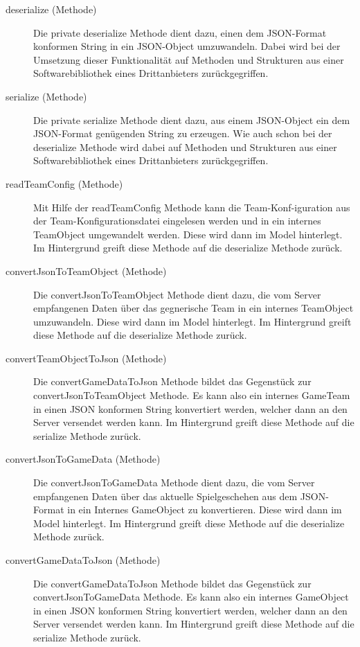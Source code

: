 		\begin{description}
                
        	\item[deserialize (Methode)]
        	Die private deserialize Methode dient dazu, einen dem JSON-Format konformen String in ein JSON-Object umzuwandeln. Dabei wird bei der Umsetzung dieser Funktionalität auf Methoden und Strukturen aus einer Softwarebibliothek eines Drittanbieters zurückgegriffen. 
        	
        	\item[serialize (Methode)]
        	Die private serialize Methode dient dazu, aus einem JSON-Object ein dem JSON-Format genügenden String zu erzeugen. Wie auch schon bei der deserialize Methode wird dabei auf Methoden und Strukturen aus einer Softwarebibliothek eines Drittanbieters zurückgegriffen. 
        	
        	\item[readTeamConfig (Methode)]
        	Mit Hilfe der readTeamConfig Methode kann die Team-Konf-iguration aus der Team-Konfigurationsdatei eingelesen werden und in ein internes TeamObject umgewandelt werden. Diese wird dann im Model hinterlegt. Im Hintergrund greift diese Methode auf die deserialize Methode zurück.
        	
        	\item[convertJsonToTeamObject (Methode)]
        	Die convertJsonToTeamObject Methode dient dazu, die vom Server empfangenen Daten über das gegnerische Team in ein internes TeamObject umzuwandeln. Diese wird dann im Model hinterlegt. Im Hintergrund greift diese Methode auf die deserialize Methode zurück. 
        	\item[convertTeamObjectToJson (Methode)]
        	Die convertGameDataToJson Methode bildet das Gegenstück zur convertJsonToTeamObject Methode. Es kann also ein internes GameTeam in einen JSON konformen String konvertiert werden, welcher dann an den Server versendet werden kann. Im Hintergrund greift diese Methode auf die serialize Methode zurück.
        	
        	\item[convertJsonToGameData (Methode)]
        	Die convertJsonToGameData Methode dient dazu, die vom Server empfangenen Daten über das aktuelle Spielgeschehen aus dem JSON-Format in ein Internes GameObject zu konvertieren. Diese wird dann im Model hinterlegt. Im Hintergrund greift diese Methode auf die deserialize Methode zurück. 

			\item[convertGameDataToJson (Methode)]
        	Die convertGameDataToJson Methode bildet das Gegenstück zur convertJsonToGameData Methode. Es kann also ein internes GameObject in einen JSON konformen String konvertiert werden, welcher dann an den Server versendet werden kann. Im Hintergrund greift diese Methode auf die serialize Methode zurück. 
        	
    	\end{description}
    	
